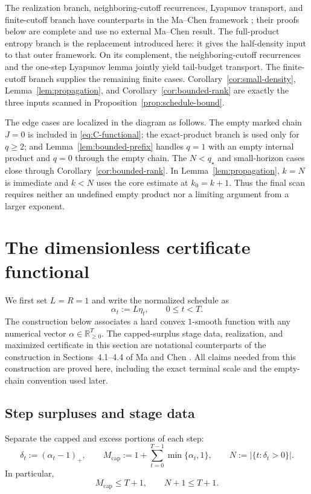 \documentclass[11pt]{article}
\theoremstyle{definition}
\theoremstyle{remark}
\newcommand{\R}{\mathbb{R}}
\newcommand{\rankmass}{M}
\newcommand{\rankcut}{q_{\star}}
\begin{document}
The realization branch, neighboring-cutoff recurrences, Lyapunov transport,
and finite-cutoff branch have counterparts in the Ma--Chen framework
\cite{machen2026}; their proofs below are complete and use no external
Ma--Chen result.  The full-product entropy branch is the
replacement introduced here: it gives the half-density input to that outer
framework.  On its complement, the neighboring-cutoff recurrences and the
one-step Lyapunov lemma jointly yield tail-budget transport.  The
finite-cutoff branch supplies the remaining finite cases.
Corollary~\ref{cor:small-density},
Lemma~\ref{lem:propagation}, and Corollary~\ref{cor:bounded-rank} are exactly
the three inputs scanned in Proposition~\ref{prop:schedule-bound}.

The edge cases are localized in the diagram as follows.  The empty marked
chain \(J=0\) is included in \eqref{eq:C-functional}; the exact-product
branch is used only for \(q\ge2\); and
Lemma~\ref{lem:bounded-prefix} handles \(q=1\) with an empty internal product
and \(q=0\) through the empty chain.  The \(N<\rankcut\) and small-horizon cases
close through Corollary~\ref{cor:bounded-rank}.  In
Lemma~\ref{lem:propagation}, \(k=N\) is immediate and \(k<N\) uses the core
estimate at \(k_0=k+1\).  Thus the final scan requires neither an undefined
empty product nor a limiting argument from a larger exponent.

\FloatBarrier
\section{The dimensionless certificate functional}
\label{sec:functional}

We first set \(L=R=1\) and write the normalized schedule as
\[
  \alpha_t:=L\eta_t,\qquad 0\le t<T.
\]
The construction below associates a hard convex \(1\)-smooth function with
any numerical vector \(\alpha\in\R_{\ge0}^T\).  The capped-surplus stage
data, realization, and maximized certificate in this section are
notational counterparts of the construction in Sections~4.1--4.4 of Ma and
Chen \cite{machen2026}.  All claims needed from this construction are proved
here, including the exact terminal scale and the empty-chain convention used
later.

\subsection{Step surpluses and stage data}

Separate the capped and excess portions of each step:
\begin{equation}
 \delta_t:=(\alpha_t-1)_+,
 \qquad
 \rankmass_{\mathrm{cap}}
 :=1+\sum_{t=0}^{T-1}\min\{\alpha_t,1\},
 \qquad
 N:=\bigl|\{t:\delta_t>0\}\bigr|.
 \label{eq:base-mass}
\end{equation}
In particular,
\begin{equation}
  \rankmass_{\mathrm{cap}}\le T+1,\qquad N+1\le T+1.
  \label{eq:B-r-horizon}
\end{equation}
\end{document}
